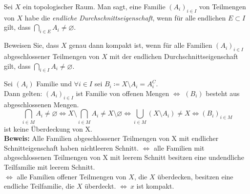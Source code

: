 \begin{assignment}
  Sei \( X \) ein topologischer Raum. Man sagt, eine Familie \( {(A_i)}_{i \in I} \) von Teilmengen von \( X \) habe die \emph{endliche Durchschnittseigenschaft}, wenn für alle endlichen \( E \subset I \) gilt, dass \( \bigcap_{i \in E} A_i \neq \varnothing \).
  
  Beweisen Sie, dass \( X \) genau dann kompakt ist, wenn für alle Familien \( {(A_i)}_{i \in I} \) abgeschlossener Teilmengen von \( X \) mit der endlichen Durchschnittseigenschaft gilt, dass \( \bigcap_{i \in I} A_i \neq \varnothing \).
\end{assignment}
\begin{solution}
  Sei \( (A_i) \) Familie und \( \forall i \in I \) sei \( B_i \coloneqq X \setminus A_i = A_i^{C} \). \\
  Dann gelten: 
  \( {(A_i)}_ { i \in I} \) ist Familie von offenen Mengen \( \Longleftrightarrow \) \( (B_i) \) besteht aus abgeschlossenen Mengen.
  \begin{equation*}
    \bigcap_{i \in M} A_i \neq \varnothing \Leftrightarrow X \setminus \bigcap_{i \in M} A_i \neq X \setminus \varnothing \Leftrightarrow \bigcup_ {i \in M} (X \setminus A_i) \neq X \Longleftrightarrow {(B_i)}_{i \in M} 
  \end{equation*}
  ist keine Überdeckung von X. \\
  \textbf{Beweis:} Alle Familien abgeschlossener Teilmengen von X mit endlicher Schnitteigenschaft haben nichtleeren Schnitt. \( \Leftrightarrow \) alle Familien mit abgeschlossenen Teilmengen von X mit leerem Schnitt besitzen eine undendliche Teilfamilie mit leerem Schnitt. \\
  \( \Leftrightarrow \) alle Familien offener Teilmengen von \( X \), die \( X \) überdecken, besitzen eine endliche Teilfamilie, die \( X \) überdeckt. \( \Longleftrightarrow \ x \) ist kompakt.
\end{solution}

